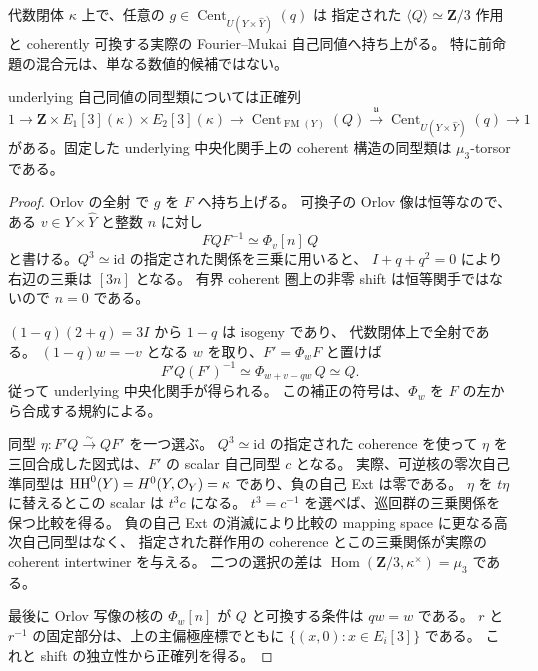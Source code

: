 \begin{lemma}
\label{mbfc:lem:cyclic-centralizer-lift}
代数閉体 $\kappa$ 上で、任意の
$g\in\operatorname{Cent}_{U(Y\times\widehat Y)}(q)$ は
指定された $\langle Q\rangle\simeq\mathbf Z/3$ 作用と
coherently 可換する実際の Fourier--Mukai 自己同値へ持ち上がる。
特に前命題の混合元は、単なる数値的候補ではない。

underlying 自己同値の同型類については正確列
\[
 1\longrightarrow
   \mathbf Z\times E_1[3](\kappa)\times E_2[3](\kappa)
 \longrightarrow \operatorname{Cent}_{\operatorname{FM}(Y)}(Q)
 \xrightarrow{\mathfrak u}
   \operatorname{Cent}_{U(Y\times\widehat Y)}(q)
 \longrightarrow1
\]
がある。固定した underlying 中央化関手上の coherent 構造の同型類は
$\mu_3$-torsor である。
\end{lemma}
\begin{proof}
Orlov の全射 \cite[Theorem~4.14]{MBFCOrlovAbelian}で $g$ を $F$ へ持ち上げる。
可換子の Orlov 像は恒等なので、ある $v\in Y\times\widehat Y$ と整数 $n$ に対し
\[
 FQF^{-1}\simeq\Phi_v[n]\,Q
\]
と書ける。$Q^3\simeq\mathrm{id}$ の指定された関係を三乗に用いると、
$I+q+q^2=0$ により右辺の三乗は $[3n]$ となる。
有界 coherent 圏上の非零 shift は恒等関手ではないので $n=0$ である。

$(1-q)(2+q)=3I$ から $1-q$ は isogeny であり、
代数閉体上で全射である。
$(1-q)w=-v$ となる $w$ を取り、$F'=\Phi_wF$ と置けば
\[
 F'Q(F')^{-1}
   \simeq \Phi_{w+v-qw}\,Q
   \simeq Q.
\]
従って underlying 中央化関手が得られる。
この補正の符号は、$\Phi_w$ を $F$ の左から合成する規約による。

同型 $\eta:F'Q\xrightarrow{\sim}QF'$ を一つ選ぶ。
$Q^3\simeq\mathrm{id}$ の指定された coherence を使って
$\eta$ を三回合成した図式は、$F'$ の scalar 自己同型 $c$ となる。
実際、可逆核の零次自己準同型は
$\mathrm{HH}^0(Y)=H^0(Y,\mathcal O_Y)=\kappa$ であり、負の自己 Ext は零である。
$\eta$ を $t\eta$ に替えるとこの scalar は $t^3c$ になる。
$t^3=c^{-1}$ を選べば、巡回群の三乗関係を保つ比較を得る。
負の自己 Ext の消滅により比較の mapping space に更なる高次自己同型はなく、
指定された群作用の coherence とこの三乗関係が実際の coherent intertwiner を与える。
二つの選択の差は
$\operatorname{Hom}(\mathbf Z/3,\kappa^\times)=\mu_3$ である。

最後に Orlov 写像の核の $\Phi_w[n]$ が $Q$ と可換する条件は $qw=w$ である。
$r$ と $r^{-1}$ の固定部分は、上の主偏極座標でともに
$\{(x,0):x\in E_i[3]\}$ である。
これと shift の独立性から正確列を得る。
\end{proof}


